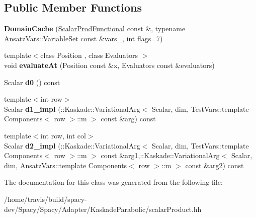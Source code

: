 \subsection*{Public Member Functions}
\begin{DoxyCompactItemize}
\item 
\hypertarget{classSpacy_1_1KaskadeParabolic_1_1PDE_1_1ScalarProdFunctional_1_1DomainCache_a8567095ed86aad8c7932e77868ac5ac3}{{\bfseries Domain\-Cache} (\hyperlink{classSpacy_1_1KaskadeParabolic_1_1PDE_1_1ScalarProdFunctional}{Scalar\-Prod\-Functional} const \&, typename Ansatz\-Vars\-::\-Variable\-Set const \&vars\-\_\-, int flags=7)}\label{classSpacy_1_1KaskadeParabolic_1_1PDE_1_1ScalarProdFunctional_1_1DomainCache_a8567095ed86aad8c7932e77868ac5ac3}

\item 
\hypertarget{classSpacy_1_1KaskadeParabolic_1_1PDE_1_1ScalarProdFunctional_1_1DomainCache_a3848648c67f6f0a58c0a8c13653127e9}{{\footnotesize template$<$class Position , class Evaluators $>$ }\\void {\bfseries evaluate\-At} (Position const \&x, Evaluators const \&evaluators)}\label{classSpacy_1_1KaskadeParabolic_1_1PDE_1_1ScalarProdFunctional_1_1DomainCache_a3848648c67f6f0a58c0a8c13653127e9}

\item 
\hypertarget{classSpacy_1_1KaskadeParabolic_1_1PDE_1_1ScalarProdFunctional_1_1DomainCache_ad5365bafc889108efac40129e52de893}{Scalar {\bfseries d0} () const }\label{classSpacy_1_1KaskadeParabolic_1_1PDE_1_1ScalarProdFunctional_1_1DomainCache_ad5365bafc889108efac40129e52de893}

\item 
\hypertarget{classSpacy_1_1KaskadeParabolic_1_1PDE_1_1ScalarProdFunctional_1_1DomainCache_a11ab4577fbf43246f64eac9402573100}{{\footnotesize template$<$int row$>$ }\\Scalar {\bfseries d1\-\_\-impl} (\-::Kaskade\-::\-Variational\-Arg$<$ Scalar, dim, Test\-Vars\-::template Components$<$ row $>$\-::m $>$ const \&arg) const }\label{classSpacy_1_1KaskadeParabolic_1_1PDE_1_1ScalarProdFunctional_1_1DomainCache_a11ab4577fbf43246f64eac9402573100}

\item 
\hypertarget{classSpacy_1_1KaskadeParabolic_1_1PDE_1_1ScalarProdFunctional_1_1DomainCache_a3d73c79f5e3aa2de1ae661fecf8950f5}{{\footnotesize template$<$int row, int col$>$ }\\Scalar {\bfseries d2\-\_\-impl} (\-::Kaskade\-::\-Variational\-Arg$<$ Scalar, dim, Test\-Vars\-::template Components$<$ row $>$\-::m $>$ const \&arg1,\-::Kaskade\-::\-Variational\-Arg$<$ Scalar, dim, Ansatz\-Vars\-::template Components$<$ row $>$\-::m $>$ const \&arg2) const }\label{classSpacy_1_1KaskadeParabolic_1_1PDE_1_1ScalarProdFunctional_1_1DomainCache_a3d73c79f5e3aa2de1ae661fecf8950f5}

\end{DoxyCompactItemize}


The documentation for this class was generated from the following file\-:\begin{DoxyCompactItemize}
\item 
/home/travis/build/spacy-\/dev/\-Spacy/\-Spacy/\-Adapter/\-Kaskade\-Parabolic/scalar\-Product.\-hh\end{DoxyCompactItemize}
